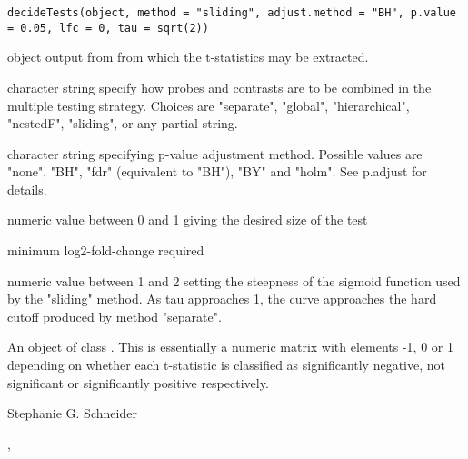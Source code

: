 \documentclass[a4paper]{book}
\begin{document}
%
\begin{Usage}
\begin{verbatim}
decideTests(object, method = "sliding", adjust.method = "BH", p.value = 0.05, lfc = 0, tau = sqrt(2))
\end{verbatim}
\end{Usage}
%
\begin{Arguments}
\begin{ldescription}
\item[\code{object}] 
 object output from  from which the t-statistics may be extracted.

\item[\code{method}] 
character string specify how probes and contrasts are to be combined in the multiple testing strategy. Choices are "separate", "global", "hierarchical", "nestedF", "sliding", or any partial string.

\item[\code{adjust.method}] 
character string specifying p-value adjustment method. Possible values are "none", "BH", "fdr" (equivalent to "BH"), "BY" and "holm". See p.adjust for details.

\item[\code{p.value}] 
numeric value between 0 and 1 giving the desired size of the test

\item[\code{lfc}] 
minimum log2-fold-change required

\item[\code{tau}] 
numeric value between 1 and 2 setting the steepness of the sigmoid function used by the "sliding" method.  As tau approaches 1, the curve approaches the hard cutoff produced by method "separate".

\end{ldescription}
\end{Arguments}
%
\begin{Value}
An object of class . This is essentially a numeric matrix with elements -1, 0 or 1 depending on whether each t-statistic is classified as significantly negative, not significant or significantly positive respectively.
\end{Value}
%
\begin{Author}\relax
Stephanie G. Schneider
\end{Author}
%
\begin{SeeAlso}\relax
{},

\end{SeeAlso}
\end{document}
